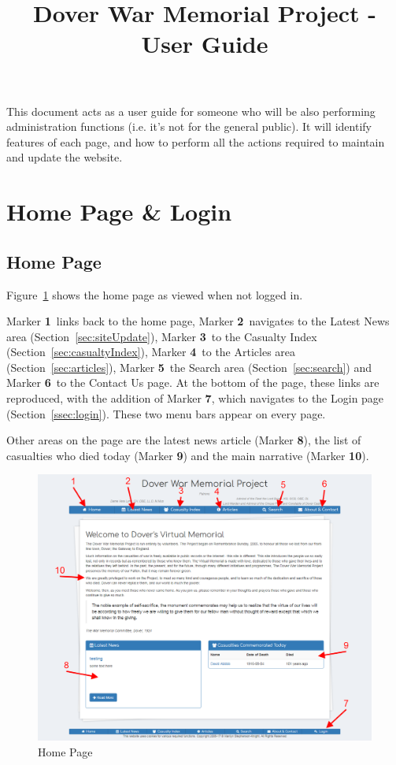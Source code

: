 \documentclass[12pt]{article}
\title{\textbf{Dover War Memorial Project - User Guide}}
\date{}
\author{}
\newcommand{\marker}[1]{Marker \color{red}\textbf{#1}\color{black}}
\begin{document}
\maketitle

This document acts as a user guide for someone who will be also performing administration functions (i.e. it's not for the general public). It will identify features of each page, and how to perform all the actions required to maintain and update the website.

\tableofcontents


\section{Home Page \& Login}

\subsection{Home Page}
Figure~\ref{fig:home} shows the home page as viewed when not logged in.

\marker{1}\ links back to the home page, \marker{2}\ navigates to the Latest News area (Section~\ref{sec:siteUpdate}), \marker{3}\ to the Casualty Index (Section~\ref{sec:casualtyIndex}), \marker{4}\ to the Articles area (Section~\ref{sec:articles}), \marker{5}\ the Search area (Section~\ref{sec:search}) and \marker{6}\ to the Contact Us page. At the bottom of the page, these links are reproduced, with the addition of \marker{7}, which navigates to the Login page (Section~\ref{ssec:login}). These two menu bars appear on every page.

Other areas on the page are the latest news article (\marker{8}), the list of casualties who died today (\marker{9}) and the main narrative (\marker{10}).

\begin{figure}[h]
  \centering
 \includegraphics[width=\textwidth]{pics/home.png}
	\caption{Home Page}\label{fig:home}
\end{figure}
\end{document}
